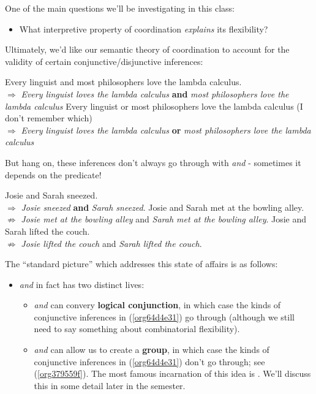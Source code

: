 \documentclass[letterpaper,parskip=half]{scrartcl}
\begin{document}
One of the main questions we'll be investigating in this class:

\begin{itemize}
\item What interpretive property of coordination \emph{explains} its flexibility?
\end{itemize}

Ultimately, we'd like our semantic theory of coordination to account for the validity of certain conjunctive/disjunctive inferences: 

\begin{exe}
\ex Every linguist and most philosophers love the lambda calculus.\\
\(\Rightarrow\) \emph{Every linguist loves the lambda calculus} \textbf{and} \emph{most philosophers love the lambda calculus}
\ex Every linguist or most philosophers love the lambda calculus (I don't remember which)\\
\(\Rightarrow\) \emph{Every linguist loves the lambda calculus} \textbf{or} \emph{most philosophers love the lambda calculus}
\label{org64d4e31}
\end{exe}

But hang on, these inferences don't always go through with \emph{and} - sometimes it depends on the predicate!

\begin{exe}
\ex Josie and Sarah sneezed.\\
\(\Rightarrow\) \emph{Josie sneezed} \textbf{and} \emph{Sarah sneezed}.
\ex Josie and Sarah met at the bowling alley.\\
\(\not\Rightarrow\) \emph{Josie met at the bowling alley} and \emph{Sarah met at the bowling alley}.
\ex Josie and Sarah lifted the couch.\\
\(\not\Rightarrow\) \emph{Josie lifted the couch} and \emph{Sarah lifted the couch}.
\label{org379559f}
\end{exe}

The ``standard picture'' which addresses this state of affairs is as follows:

\begin{itemize}
\item \emph{and} in fact has two distinct lives:
\begin{itemize}
\item \emph{and} can convery \textbf{logical conjunction}, in which case the kinds of conjunctive inferences in (\ref{org64d4e31}) go through (although we still need to say something about combinatorial flexibility).
\item \emph{and} can allow us to create a \textbf{group}, in which case the kinds of conjunctive inferences in (\ref{org64d4e31}) don't go through; see (\ref{org379559f}). The most famous incarnation of this idea is \autocite{Link1983a}. We'll discuss this in some detail later in the semester.
\end{itemize}
\end{itemize}
\end{document}
